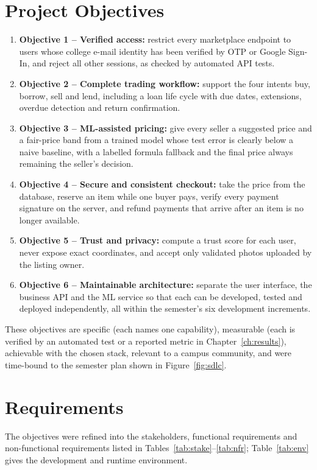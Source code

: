 \documentclass[12pt,letterpaper,twoside,openany]{report}
\begin{document}
\section{Project Objectives}
\begin{enumerate}
  \item \textbf{Objective 1 -- Verified access:} restrict every marketplace endpoint to users whose
        college e-mail identity has been verified by OTP or Google Sign-In, and reject all other
        sessions, as checked by automated API tests.
  \item \textbf{Objective 2 -- Complete trading workflow:} support the four intents buy, borrow, sell and
        lend, including a loan life cycle with due dates, extensions, overdue detection and return
        confirmation.
  \item \textbf{Objective 3 -- ML-assisted pricing:} give every seller a suggested price and a fair-price
        band from a trained model whose test error is clearly below a naive baseline, with a labelled
        formula fallback and the final price always remaining the seller's decision.
  \item \textbf{Objective 4 -- Secure and consistent checkout:} take the price from the database, reserve
        an item while one buyer pays, verify every payment signature on the server, and refund payments
        that arrive after an item is no longer available.
  \item \textbf{Objective 5 -- Trust and privacy:} compute a trust score for each user, never expose exact
        coordinates, and accept only validated photos uploaded by the listing owner.
  \item \textbf{Objective 6 -- Maintainable architecture:} separate the user interface, the business API
        and the ML service so that each can be developed, tested and deployed independently, all within
        the semester's six development increments.
\end{enumerate}

These objectives are specific (each names one capability), measurable (each is verified by an
automated test or a reported metric in Chapter~\ref{ch:results}), achievable with the chosen stack,
relevant to a campus community, and were time-bound to the semester plan shown in Figure~\ref{fig:sdlc}.

\section{Requirements}
The objectives were refined into the stakeholders, functional requirements and non-functional
requirements listed in Tables~\ref{tab:stake}--\ref{tab:nfr}; Table~\ref{tab:env} gives the development
and runtime environment.
\end{document}
